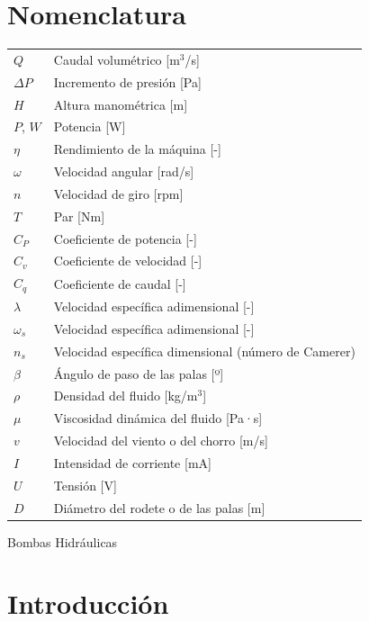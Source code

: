 \documentclass[10pt]{IEEEtran}
\begin{document}
\section*{Nomenclatura}
\begin{tabular}{ll}
$Q$ & Caudal volumétrico [m$^3$/s] \\
$\Delta P$ & Incremento de presión [Pa] \\
$H$ & Altura manométrica [m] \\
$P$, $W$ & Potencia [W] \\
$\eta$ & Rendimiento de la máquina [-] \\
$\omega$ & Velocidad angular [rad/s] \\
$n$ & Velocidad de giro [rpm] \\
$T$ & Par [Nm] \\
$C_P$ & Coeficiente de potencia [-] \\
$C_v$ & Coeficiente de velocidad [-] \\
$C_q$ & Coeficiente de caudal [-] \\
$\lambda$ & Velocidad específica adimensional [-] \\
$\omega_s$ & Velocidad específica adimensional [-] \\
$n_s$ & Velocidad específica dimensional (número de Camerer) \\
$\beta$ & Ángulo de paso de las palas [º] \\
$\rho$ & Densidad del fluido [kg/m$^3$] \\
$\mu$ & Viscosidad dinámica del fluido [Pa·s] \\
$v$ & Velocidad del viento o del chorro [m/s] \\
$I$ & Intensidad de corriente [mA] \\
$U$ & Tensión [V] \\
$D$ & Diámetro del rodete o de las palas [m] \\
\end{tabular}



\newpage
\twocolumn
{\LARGE Bombas Hidráulicas \par}
\setcounter{section}{0}
\setcounter{subsection}{0}
\setcounter{subsubsection}{0}

\section{Introducción}
\end{document}
